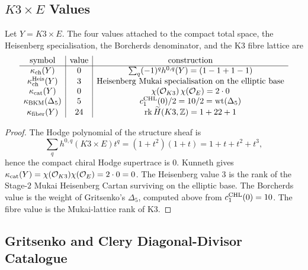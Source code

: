 \subsection*{\texorpdfstring{$K3\times E$}{K3 x E} Values}

\begin{theorem}
\label{wn:thm:k3xe-four-subscripted-values}
Let $Y=K3\times E$.  The four values attached to the compact total
space, the Heisenberg specialisation, the Borcherds denominator, and the
K3 fibre lattice are
\[
\begin{array}{c|c|c}
\text{symbol} & \text{value} & \text{construction}\\
\hline
\kappa_{\mathrm{ch}}(Y) & 0 &
\sum_q(-1)^q h^{0,q}(Y)=(1-1+1-1)\\
\kappa_{\mathrm{ch}}^{\mathrm{Heis}}(Y) & 3 &
\text{Heisenberg Mukai specialisation on the elliptic base}\\
\kappa_{\mathrm{cat}}(Y) & 0 &
\chi(\mathcal{O}_{K3})\,\chi(\mathcal{O}_E)=2\cdot0\\
\kappa_{\mathrm{BKM}}(\Delta_5) & 5 &
c_1^{\mathrm{CHL}}(0)/2=10/2=\operatorname{wt}(\Delta_5)\\
\kappa_{\mathrm{fiber}}(Y) & 24 &
\operatorname{rk}\widetilde H(K3,\mathbb Z)=1+22+1
\end{array}
\]
\end{theorem}
\begin{proof}
The Hodge polynomial of the structure sheaf is
\[
  \sum_q h^{0,q}(K3\times E)t^q=(1+t^2)(1+t)
  =1+t+t^2+t^3,
\]
hence the compact chiral Hodge supertrace is $0$.  Kunneth gives
$\kappa_{\mathrm{cat}}(Y)=\chi(\mathcal{O}_{K3})\chi(\mathcal{O}_E)=2\cdot0=0$.  The Heisenberg value
$3$ is the rank of the Stage-$2$ Mukai Heisenberg Cartan surviving on
the elliptic base.  The Borcherds value is the weight of Gritsenko's
$\Delta_5$, computed above from $c_1^{\mathrm{CHL}}(0)=10$.  The fibre value is
the Mukai-lattice rank of K3.
\end{proof}

\subsection*{Gritsenko and Clery Diagonal-Divisor Catalogue}

